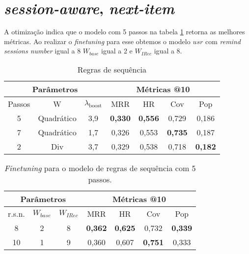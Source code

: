 \section{\textit{session-aware}, \textit{next-item}}

A otimização indica que o modelo com 5 passos na tabela \ref{opt:seq_rules}
retorna as melhores métricas. Ao realizar o \textit{finetuning} para esse
obtemos o modelo $usr$ com \textit{remind sessions number} igual a 8 $W_{base}$
igual a 2 e $W_{IRec}$ igual a 8.

\begin{table}[htbp]
  \centering
  \begin{tabular}{|c|c|c|c|c|c|c|}
    \hline
      \multicolumn{3}{|c|}{Parâmetros} & \multicolumn{4}{c|}{Métricas @10} \\
      \hline
      Passos & W & $\lambda_{\text{boost}}$ & MRR & HR & Cov & Pop \\
      \hline
      5 & Quadrático & 3,9 & \textbf{0,330} & \textbf{0,556} & 0,729 & 0,186 \\
      \hline
      7 & Quadrático & 1,7 & 0,326 & 0,553 & \textbf{0,735} & 0,187 \\
      \hline
      2 & Div & 3,7 & 0,329 & 0,538 & 0,718 & \textbf{0,182} \\
      \hline
      \end{tabular}
      \caption{Regras de sequência}
      \label{opt:seq_rules}
\end{table}
\begin{table}
  \centering
  \begin{tabular}{|c|c|c|c|c|c|c|}
    \hline
      \multicolumn{3}{|c|}{Parâmetros} & \multicolumn{4}{c|}{Métricas @10} \\
      \hline
      r.s.n. & $W_{base}$ & $W_{IRec}$ & MRR & HR & Cov & Pop \\
      \hline
      8 & 2 & 8 & \textbf{0,362} & \textbf{0,625} & 0,732 & \textbf{0,339} \\
    \hline
     10 & 1 & 9 & 0,360 & 0,607 & \textbf{0,751} & 0,333 \\
     \hline
  \end{tabular}
  \caption{\textit{Finetuning} para o modelo de regras de sequência com 5 passos.}
\end{table}

